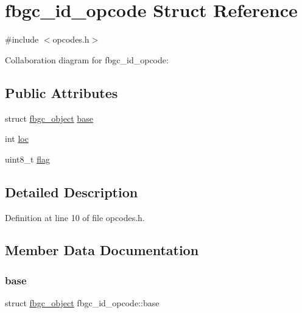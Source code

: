 \hypertarget{structfbgc__id__opcode}{}\section{fbgc\+\_\+id\+\_\+opcode Struct Reference}
\label{structfbgc__id__opcode}


{\ttfamily \#include $<$opcodes.\+h$>$}



Collaboration diagram for fbgc\+\_\+id\+\_\+opcode\+:
\subsection*{Public Attributes}
\begin{DoxyCompactItemize}
\item 
struct \hyperlink{structfbgc__object}{fbgc\+\_\+object} \hyperlink{structfbgc__id__opcode_a5bfd278bbac70dd6cbdd9e93b6a7b7b8}{base}
\item 
int \hyperlink{structfbgc__id__opcode_aea7f1dc6776a5a16ce99ff1fb58f9681}{loc}
\item 
uint8\+\_\+t \hyperlink{structfbgc__id__opcode_a9e94ad23e577f45553e7b36b63801d13}{flag}
\end{DoxyCompactItemize}


\subsection{Detailed Description}


Definition at line 10 of file opcodes.\+h.



\subsection{Member Data Documentation}
\mbox{\label{structfbgc__id__opcode_a5bfd278bbac70dd6cbdd9e93b6a7b7b8}} 
\subsubsection{\texorpdfstring{base}{base}}
{\footnotesize\ttfamily struct \hyperlink{structfbgc__object}{fbgc\+\_\+object} fbgc\+\_\+id\+\_\+opcode\+::base}



